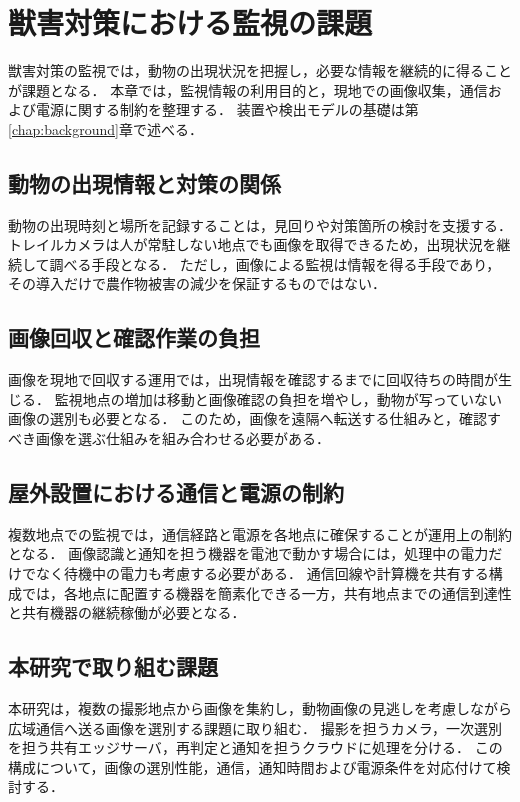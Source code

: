 \chapter{獣害対策における監視の課題}
\label{chap:research-background}

獣害対策の監視では，動物の出現状況を把握し，必要な情報を継続的に得ることが課題となる．
本章では，監視情報の利用目的と，現地での画像収集，通信および電源に関する制約を整理する．
装置や検出モデルの基礎は第\ref{chap:background}章で述べる．

\section{動物の出現情報と対策の関係}
動物の出現時刻と場所を記録することは，見回りや対策箇所の検討を支援する．
トレイルカメラは人が常駐しない地点でも画像を取得できるため，出現状況を継続して調べる手段となる\cite{Beery2019,IEICE2020}．
ただし，画像による監視は情報を得る手段であり，その導入だけで農作物被害の減少を保証するものではない．

\section{画像回収と確認作業の負担}
画像を現地で回収する運用では，出現情報を確認するまでに回収待ちの時間が生じる．
監視地点の増加は移動と画像確認の負担を増やし，動物が写っていない画像の選別も必要となる\cite{Beery2019}．
このため，画像を遠隔へ転送する仕組みと，確認すべき画像を選ぶ仕組みを組み合わせる必要がある．

\section{屋外設置における通信と電源の制約}
複数地点での監視では，通信経路と電源を各地点に確保することが運用上の制約となる．
画像認識と通知を担う機器を電池で動かす場合には，処理中の電力だけでなく待機中の電力も考慮する必要がある\cite{IEICE2020,Sato2022}．
通信回線や計算機を共有する構成では，各地点に配置する機器を簡素化できる一方，共有地点までの通信到達性と共有機器の継続稼働が必要となる．

\section{本研究で取り組む課題}
本研究は，複数の撮影地点から画像を集約し，動物画像の見逃しを考慮しながら広域通信へ送る画像を選別する課題に取り組む．
撮影を担うカメラ，一次選別を担う共有エッジサーバ，再判定と通知を担うクラウドに処理を分ける．
この構成について，画像の選別性能，通信，通知時間および電源条件を対応付けて検討する．
